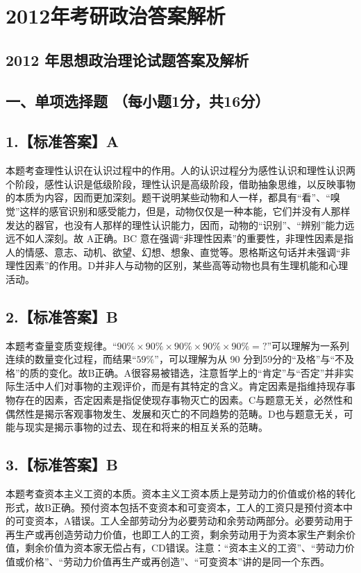 \documentclass[UTF8,11pt]{ctexart}
\begin{document}
\section*{2012年考研政治答案解析}
\subsection*{2012 年思想政治理论试题答案及解析}

\subsection*{一、单项选择题 （每小题1分，共16分）}

\subsection*{1.【标准答案】A}

本题考查理性认识在认识过程中的作用。人的认识过程分为感性认识和理性认识两个阶段，感性认识是低级阶段，理性认识是高级阶段，借助抽象思维，以反映事物的本质为内容，因而更加深刻。题干说明某些动物和人一样，都具有“看”、“嗅觉”这样的感官识别和感受能力，但是，动物仅仅是一种本能，它们并没有人那样发达的器官，也没有人那样的理性认识能力，因而，动物的“识别”、“辨别”能力远远不如人深刻。故 A正确。BC 意在强调“非理性因素”的重要性，非理性因素是指人的情感、意志、动机、欲望、幻想、想象、直觉等。恩格斯这句话并未强调“非理性因素”的作用。D并非人与动物的区别，某些高等动物也具有生理机能和心理活动。


\subsection*{2.【标准答案】B}

本题考查量变质变规律。“\(\displaystyle 90\%\times90\%\times90\%\times90\%\times90\%=\text{?}\)”可以理解为一系列连续的数量变化过程，而结果“\(\displaystyle 59\%\)”，可以理解为从 90 分到59分的“及格”与“不及格”的质的变化。故B正确。A很容易被错选，注意哲学上的“肯定”与“否定”并非实际生活中人们对事物的主观评价，而是有其特定的含义。肯定因素是指维持现存事物存在的因素，否定因素是指促使现存事物灭亡的因素。C与题意无关，必然性和偶然性是揭示客观事物发生、发展和灭亡的不同趋势的范畴。D也与题意无关，可能与现实是揭示事物的过去、现在和将来的相互关系的范畴。


\subsection*{3.【标准答案】B}

本题考查资本主义工资的本质。资本主义工资本质上是劳动力的价值或价格的转化形式，故B正确。预付资本包括不变资本和可变资本，工人的工资只是预付资本中的可变资本，A错误。工人全部劳动分为必要劳动和余劳动两部分。必要劳动用于再生产或再创造劳动力价值，也即工人的工资，剩余劳动用于为资本家生产剩余价值，剩余价值为资本家无偿占有，CD错误。注意：“资本主义的工资”、“劳动力价值或价格”、“劳动力价值再生产或再创造”、“可变资本”讲的是同一个东西。
\end{document}
